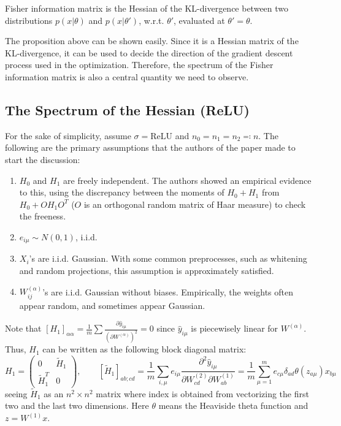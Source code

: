 \documentclass[notitlepage]{report}
\begin{document}
Fisher information matrix is the Hessian of the KL-divergence between two distributions $p(x|\theta)$ and $p(x|\theta')$, w.r.t. $\theta'$, evaluated at $\theta'=\theta$.

The proposition above can be shown easily. Since it is a Hessian matrix of the KL-divergence, it can be used to decide the direction of the gradient descent process used in the optimization. Therefore, the spectrum of the Fisher information matrix is also a central quantity we need to observe.

\subsection{The Spectrum of the Hessian (ReLU) \cite{pennington-bahri}}

For the sake of simplicity, assume $\sigma = \text{ReLU}$ and $n_0 = n_1 = n_2 \eqqcolon n$. The following are the primary assumptions that the authors of the paper made to start the discussion:
\begin{enumerate}
    \item $H_0$ and $H_1$ are freely independent. The authors showed an empirical evidence to this, using the discrepancy between the moments of $H_0+H_1$ from $H_0 + OH_1O^T$ ($O$ is an orthogonal random matrix of Haar measure) to check the freeness.
    \item $e_{i\mu} \sim N(0,1)$, i.i.d.
    \item $X_i$'s are i.i.d. Gaussian. With some common preprocesses, such as whitening and random projections, this assumption is approximately satisfied.
    \item $W_{ij}^{(\alpha)}$'s are i.i.d. Gaussian without biases. Empirically, the weights often appear random, and sometimes appear Gaussian.
\end{enumerate}
Note that $[H_1]_{\alpha\alpha} = \frac 1m \sum \frac{\partial \hat y_{i\mu}}{(\partial W^{(\alpha)})^2} = 0$ since $\hat y_{i\mu}$ is piecewisely linear for $W^{(\alpha)}$. Thus, $H_1$ can be written as the following block diagonal matrix:
\[ H_1 = \begin{pmatrix}
        0 & \tilde H_1 \\ \tilde H_1^T & 0
    \end{pmatrix},\qquad [\tilde H_1]_{ab;cd} = \frac 1 m \sum_{i,\mu} e_{i\mu} \frac{\partial^2 \hat y_{i\mu}}{\partial W^{(2)}_{cd}\partial W^{(1)}_{ab}} = \frac 1m \sum_{\mu=1}^m e_{c\mu}\delta_{ad}\theta(z_{a\mu}) x_{b\mu} \]
seeing $\tilde H_1$ as an $n^2\times n^2$ matrix where index is obtained from vectorizing the first two and the last two dimensions. Here $\theta$ means the Heaviside theta function and $z = W^{(1)}x$.
\end{document}
